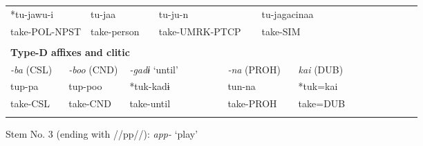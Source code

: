 \begin{tabularx}{\textwidth}{XXXXXXXXXXXXXXXXXXXXXXX}
\multicolumn{4}{X}{{ *tu-jawu-i}} & \multicolumn{3}{X}{tu-jaa} & \multicolumn{3}{X}{tu-ju-n} & \multicolumn{4}{X}{{ tu-jagacinaa}} & \multicolumn{9}{X}{}\\
\multicolumn{4}{X}{take-POL-NPST} & \multicolumn{3}{X}{take-person} & \multicolumn{3}{X}{take-UMRK-PTCP} & \multicolumn{4}{X}{take-SIM} & \multicolumn{9}{X}{}\\
\multicolumn{23}{X}{}\\
\multicolumn{23}{X}{{\bfseries Type-D affixes and clitic}}\\
\multicolumn{2}{X}{{ \textit{{}-ba} (CSL)}} & \multicolumn{4}{X}{{ \textit{{}-boo} (CND)}} & \multicolumn{3}{X}{{ \textit{{}-gadɨ} ‘until’}} & \multicolumn{3}{X}{{ \textit{{}-na} (PROH)}} & \multicolumn{4}{X}{{ \textit{kai} (DUB)}} & \multicolumn{7}{X}{}\\
\multicolumn{2}{X}{{ tup-pa}} & \multicolumn{4}{X}{{ tup-poo}} & \multicolumn{3}{X}{{ *tuk-kadɨ}} & \multicolumn{3}{X}{{ tun-na}} & \multicolumn{4}{X}{{ *tuk=kai}} & \multicolumn{7}{X}{}\\
\multicolumn{2}{X}{take-CSL} & \multicolumn{4}{X}{take-CND} & \multicolumn{3}{X}{take-until} & \multicolumn{3}{X}{take-PROH} & \multicolumn{4}{X}{take=DUB} & \multicolumn{7}{X}{}\\
\lspbottomrule
\end{tabularx}
Stem No. 3 (ending with //pp//): \textit{app-} ‘play’

\tablefirsthead{}

